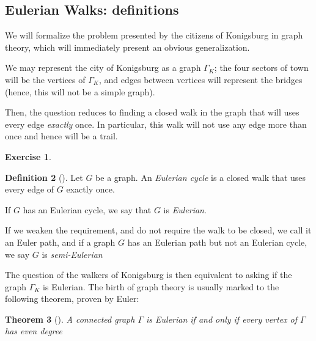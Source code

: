 \documentclass[10pt,]{book}
\theoremstyle{plain}
\newtheorem{theorem}{Theorem}[section]
\theoremstyle{definition}
\newtheorem{definition}[theorem]{Definition}
\theoremstyle{definition}
\theoremstyle{definition}
\theoremstyle{definition}
\newtheorem{exercise}[theorem]{Exercise}
\numberwithin{equation}{section}
\begin{document}
\subsection[{Eulerian Walks: definitions}]{Eulerian Walks: definitions}\label{subsection-17}
\hypertarget{p-117}{}%
We will formalize the problem presented by the citizens of Konigsburg in graph theory, which will immediately present an obvious generalization.%
\par
\hypertarget{p-118}{}%
We may represent the city of Konigsburg as a graph \(\Gamma_K\); the four sectors of town will be the vertices of \(\Gamma_K\), and edges between vertices will represent the bridges (hence, this will not be a simple graph).%
\par
\hypertarget{p-119}{}%
Then, the question reduces to finding a closed walk in the graph that will uses every edge \emph{exactly} once. In particular, this walk will not use any edge more than once and hence will be a trail.%
\begin{exercise}\label{exercise-8}
\end{exercise}
\begin{definition}[{}]\label{definition-16}
\hypertarget{p-120}{}%
Let \(G\) be a graph.  An \emph{Eulerian cycle} is a closed walk that uses every edge of \(G\) exactly once.%
\par
\hypertarget{p-121}{}%
If \(G\) has an Eulerian cycle, we say that \(G\) is \emph{Eulerian}.%
\par
\hypertarget{p-122}{}%
If we weaken the requirement, and do not require the walk to be closed, we call it an Euler path, and if a graph \(G\) has an Eulerian path but not an Eulerian cycle, we say \(G\) is \emph{semi-Eulerian}%
\end{definition}
\hypertarget{p-123}{}%
The question of the walkers of Konigsburg is then equivalent to asking if the graph \(\Gamma_K\) is Eulerian. The birth of graph theory is usually marked to the following theorem, proven by Euler:%
\begin{theorem}[{}]\label{thm_eulerian}
\hypertarget{p-124}{}%
A connected graph \(\Gamma\) is Eulerian if and only if every vertex of \(\Gamma\) has even degree%
\end{theorem}
\typeout{************************************************}
\typeout{************************************************}
\end{document}
